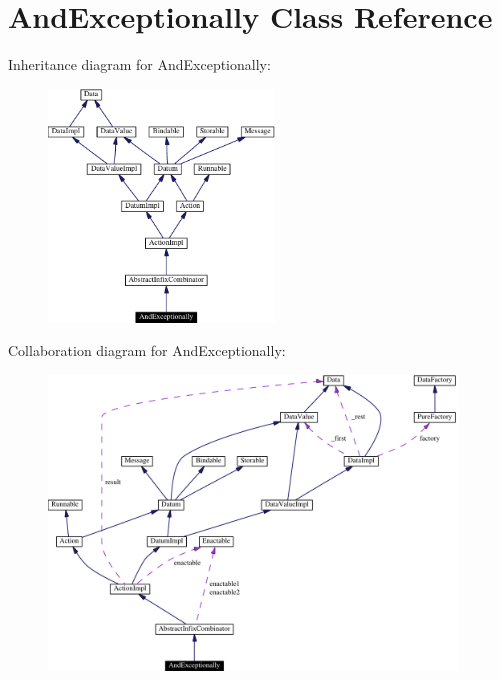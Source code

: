 \hypertarget{classAndExceptionally}{
\section{And\-Exceptionally  Class Reference}
\label{classAndExceptionally}
}
Inheritance diagram for And\-Exceptionally:\begin{figure}[H]
\begin{center}
\leavevmode
\includegraphics[width=170pt]{classAndExceptionally__inherit__graph}
\end{center}
\end{figure}
Collaboration diagram for And\-Exceptionally:\begin{figure}[H]
\begin{center}
\leavevmode
\includegraphics[width=308pt]{classAndExceptionally__coll__graph}
\end{center}
\end{figure}
